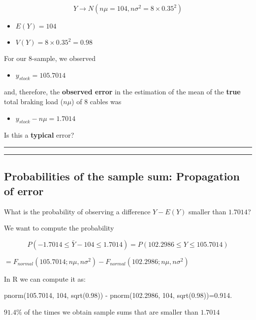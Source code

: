 \documentclass[
]{book}
\providecommand{\tightlist}{%
  \setlength{\itemsep}{0pt}\setlength{\parskip}{0pt}}
\begin{document}
\[Y \rightarrow N(n\mu=104, n\sigma^2=8\times 0.35^2)\]

\begin{itemize}
\tightlist
\item
  \(E(Y)=104\)
\item
  \(V(Y)=8\times 0.35^2=0.98\)
\end{itemize}

For our \(8\)-sample, we observed

\begin{itemize}
\tightlist
\item
  \(y_{stock}=105.7014\)
\end{itemize}

and, therefore, the \textbf{observed error} in the estimation of the mean of the \textbf{true} total braking load (\(n\mu\)) of \(8\) cables was

\begin{itemize}
\tightlist
\item
  \(y_{stock}-n\mu= 1.7014\)
\end{itemize}

Is this a \textbf{typical} error?

\begin{center}\rule{0.5\linewidth}{0.5pt}\end{center}

\begin{center}\rule{0.5\linewidth}{0.5pt}\end{center}

\hypertarget{probabilities-of-the-sample-sum-propagation-of-error}{%
\subsection{Probabilities of the sample sum: Propagation of error}\label{probabilities-of-the-sample-sum-propagation-of-error}}

What is the probability of observing a difference \(Y-E(Y)\) smaller than \(1.7014\)?

We want to compute the probability

\[P(-1.7014 \leq \bar{Y} - 104 \leq 1.7014)=P(102.2986 \leq Y \leq 105.7014)\]

\(=F_{normal}(105.7014; n\mu, n\sigma^2)-F_{normal}(102.2986; n\mu, n\sigma^2)\)

In R we can compute it as:

pnorm(105.7014, 104, sqrt(0.98)) - pnorm(102.2986, 104, sqrt(0.98))=0.914.

\(91.4\%\) of the times we obtain sample sums that are smaller than \(1.7014\)
\end{document}

